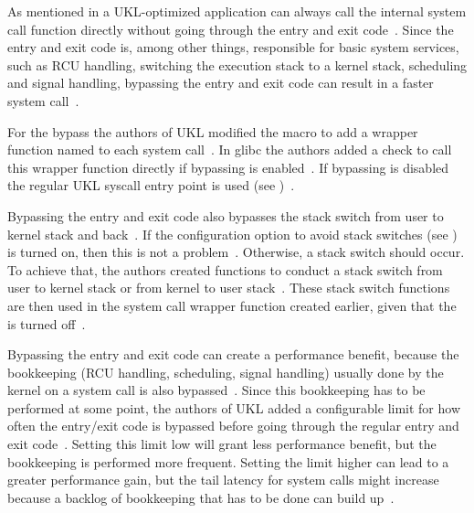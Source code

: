 \documentclass[10pt,twocolumn,a4paper]{article}
\begin{document}
      As mentioned in  a UKL-optimized application can
      always call the internal system call function directly without going through the entry and
      exit code~\cite{ukl-github-bypass}.
      Since the entry and exit code is, among other things, responsible for basic system services,
      such as RCU handling, switching the execution stack to a kernel stack, scheduling and signal
      handling, bypassing the entry and exit code can result in a faster system call~\cite{raza23}.

      For the bypass the authors of UKL modified the  macro to add
      a wrapper function named  to each system call~\cite{ukl-github-bypass}.
      In glibc the authors added a check to call this wrapper function 
      directly if bypassing is enabled~\cite{ukl-glibc-bypass}.
      If bypassing is disabled the regular UKL syscall entry point is used 
      (see )~\cite{ukl-glibc-bypass}.
      
      Bypassing the entry and exit code also bypasses the stack switch from user to kernel stack 
      and back~\cite{ukl-github-bypass}.
      If the configuration option to avoid stack switches (see ) is
      turned on, then this is not a problem~\cite{ukl-github-bypass}.
      Otherwise, a stack switch should occur.
      To achieve that, the authors created functions to conduct a stack switch from user to kernel stack 
      or from kernel to user stack~\cite{ukl-github-bypass}.
      These stack switch functions are then used in the system call wrapper function created earlier, 
      given that the  is turned off~\cite{ukl-github-bypass}.

      Bypassing the entry and exit code can create a performance benefit, because the bookkeeping
      (RCU handling, scheduling, signal handling) usually done by the kernel on a system call is also
      bypassed~\cite{ukl-github-bypass}.
      Since this bookkeeping has to be performed at some point, the authors of UKL added a configurable
      limit for how often the entry/exit code is bypassed before going through the regular entry 
      and exit code~\cite{ukl-github-bypass}.
      Setting this limit low will grant less performance benefit, but the bookkeeping is performed
      more frequent.
      Setting the limit higher can lead to a greater performance gain, but the tail latency for system 
      calls might increase because a backlog of bookkeeping that has to be done can build 
      up~\cite{ukl-github-bypass}.
\end{document}
